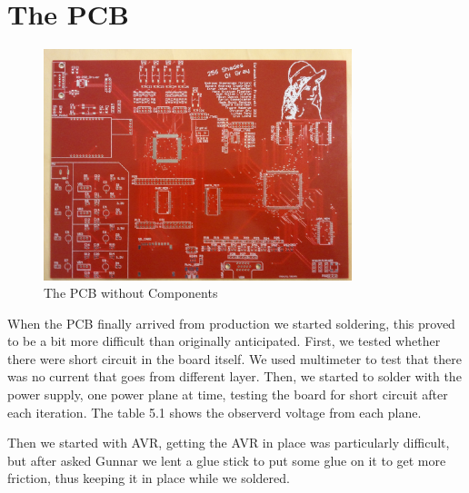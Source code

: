 \section {The PCB}
\begin{figure}[h]
  \centering
  \includegraphics[width=0.8\textwidth]{fig/pcb/pcbwithoutcomp.jpg}
  \caption{The PCB without Components}
  \label{fig:pcb}
\end{figure}
When the PCB finally arrived from production we started soldering, this proved to be a bit
more difficult than originally anticipated. First, we tested whether there were short circuit in the board itself. We used multimeter to test that there was no current that goes from different layer. Then, we started to solder with the power supply, one power plane at time, testing the board for short circuit after each iteration. The table 5.1 shows the observerd voltage from each plane. 


Then we started with AVR, getting the AVR in place was particularly difficult, but after asked Gunnar we lent a glue stick to put some glue on it to get more friction, thus keeping it in place while we soldered.

